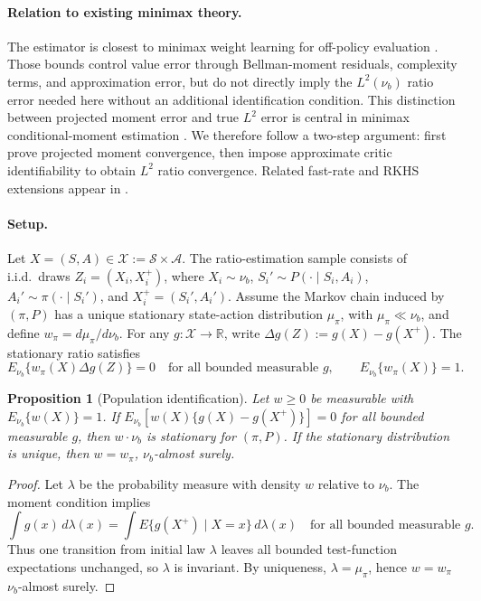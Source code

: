 \documentclass{article}
\theoremstyle{plain}
\newtheorem{proposition}{Proposition}
\theoremstyle{definition}
\theoremstyle{remark}
\begin{document}
\paragraph{Relation to existing minimax theory.}
The estimator is closest to minimax weight learning for off-policy evaluation
\citep{uehara2020minimax}. Those bounds control value error through
Bellman-moment residuals, complexity terms, and approximation error, but do not
directly imply the \(L^2(\nu_b)\) ratio error needed here without an additional
identification condition. This distinction between projected moment error and
true \(L^2\) error is central in minimax conditional-moment estimation
\citep{bennett2023minimax}. We therefore follow a two-step argument: first
prove projected moment convergence, then impose approximate critic
identifiability to obtain \(L^2\) ratio convergence. Related fast-rate and RKHS
extensions appear in
\citet{imaizumi2021minimax,olivas2025source}.

\paragraph{Setup.}
Let \(X=(S,A)\in\mathcal X:=\mathcal S\times\mathcal A\). The ratio-estimation
sample consists of i.i.d.\ draws \(Z_i=(X_i,X_i^+)\), where
\(X_i\sim\nu_b\), \(S_i'\sim P(\cdot\mid S_i,A_i)\),
\(A_i'\sim\pi(\cdot\mid S_i')\), and \(X_i^+=(S_i',A_i')\). Assume the Markov
chain induced by \((\pi,P)\) has a unique stationary state-action distribution
\(\mu_\pi\), with \(\mu_\pi\ll\nu_b\), and define
\(w_\pi=d\mu_\pi/d\nu_b\). For any \(g:\mathcal X\to\mathbb R\), write
\(\Delta g(Z):=g(X)-g(X^+)\). The stationary ratio satisfies
\begin{equation}
\label{eq:app-stationary-moment}
E_{\nu_b}\{w_\pi(X)\Delta g(Z)\}=0
\quad\text{for all bounded measurable }g,
\qquad
E_{\nu_b}\{w_\pi(X)\}=1 .
\end{equation}

\begin{proposition}[Population identification]
\label{prop:app-population-identification}
Let \(w\ge0\) be measurable with \(E_{\nu_b}\{w(X)\}=1\). If
\(E_{\nu_b}[w(X)\{g(X)-g(X^+)\}]=0\) for all bounded measurable \(g\), then
\(w\cdot\nu_b\) is stationary for \((\pi,P)\). If the stationary distribution
is unique, then \(w=w_\pi\), \(\nu_b\)-almost surely.
\end{proposition}

\begin{proof}
Let \(\lambda\) be the probability measure with density \(w\) relative to
\(\nu_b\). The moment condition implies
\[
\int g(x)\,d\lambda(x)
=
\int E\{g(X^+)\mid X=x\}\,d\lambda(x)
\quad\text{for all bounded measurable }g .
\]
Thus one transition from initial law \(\lambda\) leaves all bounded test-function
expectations unchanged, so \(\lambda\) is invariant. By uniqueness,
\(\lambda=\mu_\pi\), hence \(w=w_\pi\) \(\nu_b\)-almost surely.
\end{proof}
\end{document}
